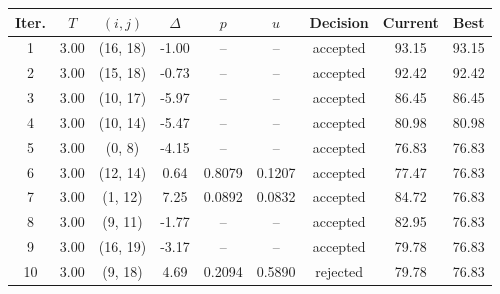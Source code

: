 \begin{tabular}{ccccccccc}
\toprule
Iter. & $T$ & $(i, j)$ & $\Delta$ & $p$ & $u$ & Decision & Current & Best \\
\midrule
1 & 3.00 & (16, 18) & -1.00 & -- & -- & accepted & 93.15 & 93.15 \\
2 & 3.00 & (15, 18) & -0.73 & -- & -- & accepted & 92.42 & 92.42 \\
3 & 3.00 & (10, 17) & -5.97 & -- & -- & accepted & 86.45 & 86.45 \\
4 & 3.00 & (10, 14) & -5.47 & -- & -- & accepted & 80.98 & 80.98 \\
5 & 3.00 & (0, 8) & -4.15 & -- & -- & accepted & 76.83 & 76.83 \\
6 & 3.00 & (12, 14) & 0.64 & 0.8079 & 0.1207 & accepted & 77.47 & 76.83 \\
7 & 3.00 & (1, 12) & 7.25 & 0.0892 & 0.0832 & accepted & 84.72 & 76.83 \\
8 & 3.00 & (9, 11) & -1.77 & -- & -- & accepted & 82.95 & 76.83 \\
9 & 3.00 & (16, 19) & -3.17 & -- & -- & accepted & 79.78 & 76.83 \\
10 & 3.00 & (9, 18) & 4.69 & 0.2094 & 0.5890 & rejected & 79.78 & 76.83 \\
\bottomrule
\end{tabular}
